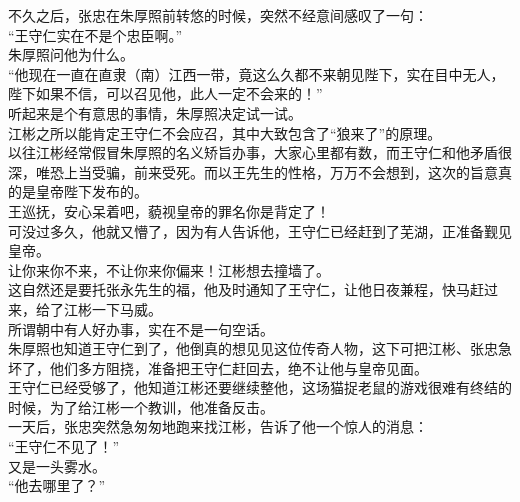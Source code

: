 \begin{multicols}{\theparacolNo}
不久之后，张忠在朱厚照前转悠的时候，突然不经意间感叹了一句：\\

“王守仁实在不是个忠臣啊。”\\

朱厚照问他为什么。\\

“他现在一直在直隶（南）江西一带，竟这么久都不来朝见陛下，实在目中无人，陛下如果不信，可以召见他，此人一定不会来的！”\\

听起来是个有意思的事情，朱厚照决定试一试。\\

江彬之所以能肯定王守仁不会应召，其中大致包含了“狼来了”的原理。\\

以往江彬经常假冒朱厚照的名义矫旨办事，大家心里都有数，而王守仁和他矛盾很深，唯恐上当受骗，前来受死。而以王先生的性格，万万不会想到，这次的旨意真的是皇帝陛下发布的。\\

王巡抚，安心呆着吧，藐视皇帝的罪名你是背定了！\\

可没过多久，他就又懵了，因为有人告诉他，王守仁已经赶到了芜湖，正准备觐见皇帝。\\

让你来你不来，不让你来你偏来！江彬想去撞墙了。\\

这自然还是要托张永先生的福，他及时通知了王守仁，让他日夜兼程，快马赶过来，给了江彬一下马威。\\

所谓朝中有人好办事，实在不是一句空话。\\

朱厚照也知道王守仁到了，他倒真的想见见这位传奇人物，这下可把江彬、张忠急坏了，他们多方阻挠，准备把王守仁赶回去，绝不让他与皇帝见面。\\

王守仁已经受够了，他知道江彬还要继续整他，这场猫捉老鼠的游戏很难有终结的时候，为了给江彬一个教训，他准备反击。\\

一天后，张忠突然急匆匆地跑来找江彬，告诉了他一个惊人的消息：\\

“王守仁不见了！”\\

又是一头雾水。\\

“他去哪里了？”\\


\end{multicols}
